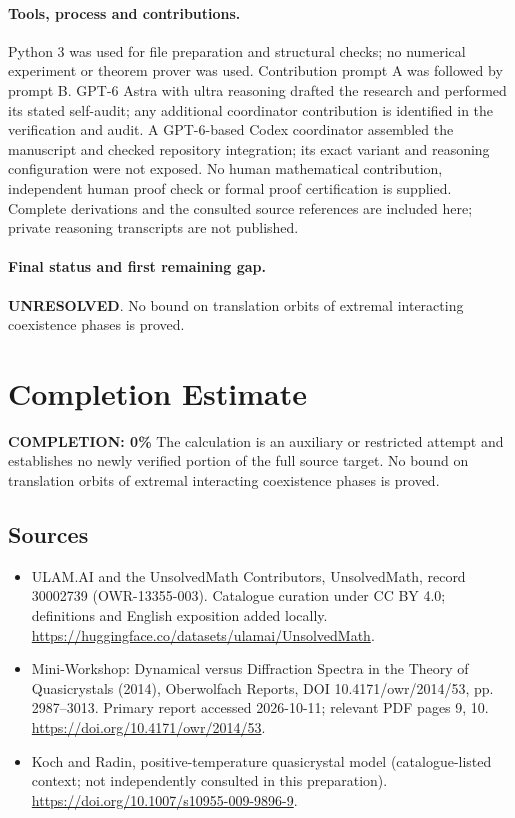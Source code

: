 \documentclass[11pt]{article}
\begin{document}
\paragraph{Tools, process and contributions.}
Python 3 was used for file preparation and structural checks; no numerical experiment or theorem prover was used. Contribution prompt A was followed by prompt B. GPT-6 Astra with ultra reasoning drafted the research and performed its stated self-audit; any additional coordinator contribution is identified in the verification and audit. A GPT-6-based Codex coordinator assembled the manuscript and checked repository integration; its exact variant and reasoning configuration were not exposed. No human mathematical contribution, independent human proof check or formal proof certification is supplied. Complete derivations and the consulted source references are included here; private reasoning transcripts are not published.

\paragraph{Final status and first remaining gap.}
\textbf{UNRESOLVED}. No bound on translation orbits of extremal interacting coexistence phases is proved.

\section{Completion Estimate}
\noindent\textbf{COMPLETION: 0\%}
The calculation is an auxiliary or restricted attempt and establishes no newly verified portion of the full source target. No bound on translation orbits of extremal interacting coexistence phases is proved.

\subsection{Sources}
\begin{itemize}
\item[\hypertarget{source:30002739:1}{S1}] ULAM.AI and the UnsolvedMath Contributors, UnsolvedMath, record 30002739 (OWR-13355-003). Catalogue curation under CC BY 4.0; definitions and English exposition added locally.
\url{https://huggingface.co/datasets/ulamai/UnsolvedMath}.
\item[\hypertarget{source:30002739:2}{S2}] Mini-Workshop: Dynamical versus Diffraction Spectra in the Theory of Quasicrystals (2014), Oberwolfach Reports, DOI 10.4171/owr/2014/53, pp. 2987--3013. Primary report accessed 2026-10-11; relevant PDF pages 9, 10.
\url{https://doi.org/10.4171/owr/2014/53}.
\item[\hypertarget{source:30002739:3}{S3}] Koch and Radin, positive-temperature quasicrystal model (catalogue-listed context; not independently consulted in this preparation).
\url{https://doi.org/10.1007/s10955-009-9896-9}.
\end{itemize}
\label{end:30002739}
\end{document}
